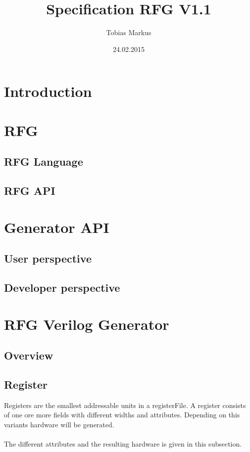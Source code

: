 \documentclass[12pt,a4paper]{article}
\begin{document}
\title{Specification RFG V1.1}
\author{Tobias Markus}
\date{24.02.2015}

\maketitle

\tableofcontents
\newpage
\section{Introduction}
\section{RFG}
\subsection{RFG Language}
\subsection{RFG API}
\section{Generator API}
\subsection{User perspective}
\subsection{Developer perspective}
\section{RFG Verilog Generator}

\subsection{Overview}
\newpage
\subsection{Register}
Registers are the smallest addressable units in a registerFile. A register consists of one ore more fields with different widths and attributes. Depending on this variants hardware  will be generated. \\
\\
The different attributes and the resulting hardware is given in this subsection. 
\end{document}
